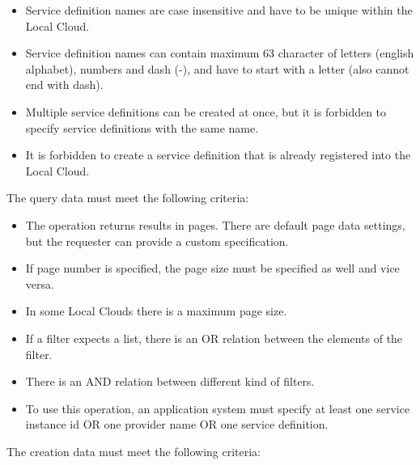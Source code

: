 \documentclass[a4paper]{arrowhead}
\begin{document}
\begin{itemize}
    \item Service definition names are case insensitive and have to be unique within the Local Cloud.
    \item Service definition names can contain maximum 63 character of letters (english alphabet), numbers and dash (-), and have to start with a letter (also cannot end with dash).
    \item Multiple service definitions can be created at once, but it is forbidden to specify service definitions with the same name.
    \item It is forbidden to create a service definition that is already registered into the Local Cloud.
\end{itemize}



The query data must meet the following criteria:

\begin{itemize}
    \item The operation returns results in pages. There are default page data settings, but the requester can provide a custom specification.
    \item If page number is specified, the page size must be specified as well and vice versa.
    \item In some Local Clouds there is a maximum page size.
    \item If a filter expects a list, there is an OR relation between the elements of the filter.
    \item There is an AND relation between different kind of filters.
    \item To use this operation, an application system must specify at least one service instance id OR one provider name OR one service definition.
\end{itemize}


The creation data must meet the following criteria:
\end{document}
